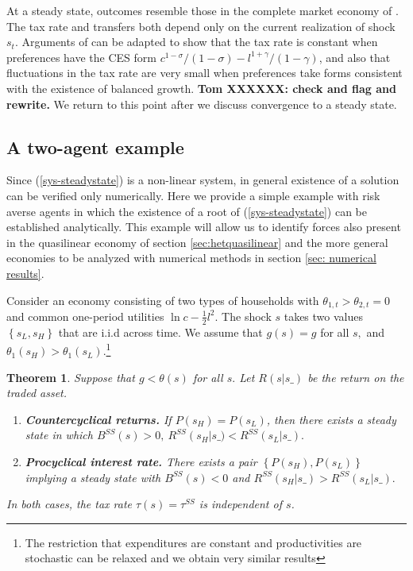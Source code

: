 \documentclass[thmsb,11pt]{article}
\newtheorem{theorem}{Theorem}
\begin{document}
\color{black}

At a steady state, outcomes resemble those in  the complete market economy of \citet{Wer07a}.
The tax rate  and transfers both depend only on the current realization of shock $s_t$.
Arguments of \citeauthor{Wer07a} can be adapted  to show that the tax rate is
constant when preferences have the CES form $c^{1-\sigma}/(1-\sigma) - l^{1+\gamma}/(1-\gamma) $,  and also that fluctuations in the tax rate
are very small when preferences take forms consistent with the existence of  balanced growth.
\textbf{Tom XXXXXX: check and flag and rewrite.} We return to this point  after we discuss convergence to a steady state.


\subsection{A two-agent example}\label{sec: 2 agent example}


Since  (\ref{sys-steadystate}) is a non-linear system, in general existence of a solution can   be verified only numerically.
      Here we provide a simple example with risk averse agents in which the existence of a root of (\ref{sys-steadystate}) can be established analytically. This example will allow us to identify forces also present in the quasilinear economy
of section \ref{sec:hetquasilinear} and  the more general economies to be analyzed with numerical methods in section \ref{sec: numerical results}.

Consider an economy consisting of  two types of households with $%
\theta _{1,t}>\theta _{2,t}=0$ and common one-period utilities  $\ln c-\frac{1}{2}%
l^{2}.$ The shock $s$  takes  two values$ \left\{
s_{L},s_{H}\right\} $ that are i.i.d across time.  We assume that $g\left( s\right) =g$ for all $s,$
and $\theta _{1}\left( s_{H}\right) >\theta _{1}\left( s_{L}\right) .$\footnote{The restriction that expenditures are constant and productivities are stochastic can be relaxed and we obtain very similar results}
\smallskip

\begin{theorem}
\label{thm long run forces}\smallskip Suppose that $g<\theta (s)$ for all $%
s.$ Let $R(s|s\_)$ be the return on the traded asset.

\begin{enumerate}
\item \textbf{Countercyclical returns.} If $P \left( s_{H}\right) =P\left( s_{L}\right)$, then
there exists a steady state in which
$B^{SS}(s)>0,\ R^{SS}\left( s_{H}\right|s\_) <R^{SS}\left( s_{L}|s\_\right) .$
\item \textbf{Procyclical interest rate.} There exists a pair  $\left\{ P \left( s_{H}\right) ,P\left( s_{L}\right)
\right\} $ implying a steady state with $B^{SS}(s)<0$ and  $R^{SS}\left( s_{H}|s\_\right) >R^{SS}\left( s_{L}|s\_\right) .$
\end{enumerate}
In both cases, the tax rate $\tau(s)=\tau^{SS}$ is independent of $s$.
\end{theorem}
\end{document}
